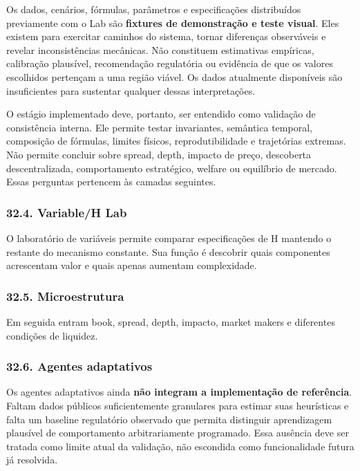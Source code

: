 \documentclass[
  a4paper,
]{article}
\begin{document}
Os dados, cenários, fórmulas, parâmetros e especificações distribuídos
previamente com o Lab são \textbf{fixtures de demonstração e teste
visual}. Eles existem para exercitar caminhos do sistema, tornar
diferenças observáveis e revelar inconsistências mecânicas. Não
constituem estimativas empíricas, calibração plausível, recomendação
regulatória ou evidência de que os valores escolhidos pertençam a uma
região viável. Os dados atualmente disponíveis são insuficientes para
sustentar qualquer dessas interpretações.

O estágio implementado deve, portanto, ser entendido como validação de
consistência interna. Ele permite testar invariantes, semântica
temporal, composição de fórmulas, limites físicos, reprodutibilidade e
trajetórias extremas. Não permite concluir sobre spread, depth, impacto
de preço, descoberta descentralizada, comportamento estratégico, welfare
ou equilíbrio de mercado. Essas perguntas pertencem às camadas
seguintes.

\hypertarget{32-4-variable-h-lab}{}

\hypertarget{324-variableh-lab}{%
\subsubsection{32.4. Variable/H Lab}\label{324-variableh-lab}}

O laboratório de variáveis permite comparar especificações de H mantendo
o restante do mecanismo constante. Sua função é descobrir quais
componentes acrescentam valor e quais apenas aumentam complexidade.

\hypertarget{32-5-microestrutura}{}

\hypertarget{325-microestrutura}{%
\subsubsection{32.5. Microestrutura}\label{325-microestrutura}}

Em seguida entram book, spread, depth, impacto, market makers e
diferentes condições de liquidez.

\hypertarget{32-6-agentes-adaptativos}{}

\hypertarget{326-agentes-adaptativos}{%
\subsubsection{32.6. Agentes
adaptativos}\label{326-agentes-adaptativos}}

Os agentes adaptativos ainda \textbf{não integram a implementação de
referência}. Faltam dados públicos suficientemente granulares para
estimar suas heurísticas e falta um baseline regulatório observado que
permita distinguir aprendizagem plausível de comportamento
arbitrariamente programado. Essa ausência deve ser tratada como limite
atual da validação, não escondida como funcionalidade futura já
resolvida.
\end{document}
